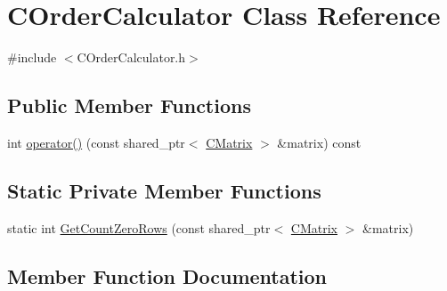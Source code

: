 \hypertarget{classCOrderCalculator}{}\section{C\+Order\+Calculator Class Reference}
\label{classCOrderCalculator}


{\ttfamily \#include $<$C\+Order\+Calculator.\+h$>$}

\subsection*{Public Member Functions}
\begin{DoxyCompactItemize}
\item 
int \hyperlink{classCOrderCalculator_a34946aaf27501915d1bc854df890ac1d}{operator()} (const shared\+\_\+ptr$<$ \hyperlink{classCMatrix}{C\+Matrix} $>$ \&matrix) const 
\end{DoxyCompactItemize}
\subsection*{Static Private Member Functions}
\begin{DoxyCompactItemize}
\item 
static int \hyperlink{classCOrderCalculator_a6dd367054326190a149d1df3683cce00}{Get\+Count\+Zero\+Rows} (const shared\+\_\+ptr$<$ \hyperlink{classCMatrix}{C\+Matrix} $>$ \&matrix)
\end{DoxyCompactItemize}


\subsection{Member Function Documentation}
